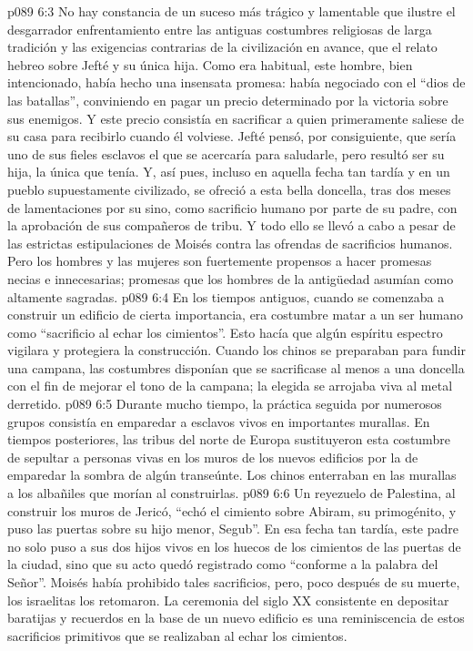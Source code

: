 \vs p089 6:3 \pc No hay constancia de un suceso más trágico y lamentable que ilustre el desgarrador enfrentamiento entre las antiguas costumbres religiosas de larga tradición y las exigencias contrarias de la civilización en avance, que el relato hebreo sobre Jefté y su única hija. Como era habitual, este hombre, bien intencionado, había hecho una insensata promesa: había negociado con el “dios de las batallas”, conviniendo en pagar un precio determinado por la victoria sobre sus enemigos. Y este precio consistía en sacrificar a quien primeramente saliese de su casa para recibirlo cuando él volviese. Jefté pensó, por consiguiente, que sería uno de sus fieles esclavos el que se acercaría para saludarle, pero resultó ser su hija, la única que tenía. Y, así pues, incluso en aquella fecha tan tardía y en un pueblo supuestamente civilizado, se ofreció a esta bella doncella, tras dos meses de lamentaciones por su sino, como sacrificio humano por parte de su padre, con la aprobación de sus compañeros de tribu. Y todo ello se llevó a cabo a pesar de las estrictas estipulaciones de Moisés contra las ofrendas de sacrificios humanos. Pero los hombres y las mujeres son fuertemente propensos a hacer promesas necias e innecesarias; promesas que los hombres de la antigüedad asumían como altamente sagradas.
\vs p089 6:4 \pc En los tiempos antiguos, cuando se comenzaba a construir un edificio de cierta importancia, era costumbre matar a un ser humano como “sacrificio al echar los cimientos”. Esto hacía que algún espíritu espectro vigilara y protegiera la construcción. Cuando los chinos se preparaban para fundir una campana, las costumbres disponían que se sacrificase al menos a una doncella con el fin de mejorar el tono de la campana; la elegida se arrojaba viva al metal derretido.
\vs p089 6:5 Durante mucho tiempo, la práctica seguida por numerosos grupos consistía en emparedar a esclavos vivos en importantes murallas. En tiempos posteriores, las tribus del norte de Europa sustituyeron esta costumbre de sepultar a personas vivas en los muros de los nuevos edificios por la de emparedar la sombra de algún transeúnte. Los chinos enterraban en las murallas a los albañiles que morían al construirlas.
\vs p089 6:6 Un reyezuelo de Palestina, al construir los muros de Jericó, “echó el cimiento sobre Abiram, su primogénito, y puso las puertas sobre su hijo menor, Segub”. En esa fecha tan tardía, este padre no solo puso a sus dos hijos vivos en los huecos de los cimientos de las puertas de la ciudad, sino que su acto quedó registrado como “conforme a la palabra del Señor”. Moisés había prohibido tales sacrificios, pero, poco después de su muerte, los israelitas los retomaron. La ceremonia del siglo XX consistente en depositar baratijas y recuerdos en la base de un nuevo edificio es una reminiscencia de estos sacrificios primitivos que se realizaban al echar los cimientos.
